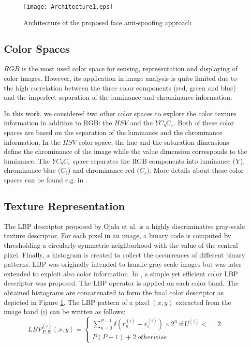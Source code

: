 \documentclass{article}
\begin{document}
\begin{figure*}[t]
	\begin{center}
		\texttt{[image: Architecture1.eps]}		
	\end{center}
		\vspace{-6mm}
	\caption{Architecture of the proposed face anti-spoofing approach}
	\label{architecture}
\end{figure*}

	\vspace{-4mm}
\subsection{Color Spaces}
$RGB$ is the most used color space for sensing, representation and displaying of color images. However,  its application in image analysis is quite limited due to the high correlation between the three color components (red, green and blue) and the imperfect separation of the luminance and chrominance information.

In this work, we considered two other color spaces to explore the color texture information in addition to RGB: the $HSV$ and the $YC_bC_r$. Both of these color spaces are based on the separation of the luminance and the chrominance information. In the $HSV$ color space, the hue and the saturation dimensions define the chrominance of the image while the value dimension corresponds to the luminance. The $YC_bC_r$ space separates the RGB components into luminance (Y), chrominance blue ($C_b$) and chrominance red ($C_r$). More details about these color spaces can be found e.g. in  \cite{color_image}. 
	\vspace{-3mm}
\subsection{Texture Representation}  
The LBP descriptor proposed by Ojala et al. \cite{lbp_ojala} is a highly discriminative gray-scale texture descriptor. For each pixel in an image, a binary code is computed by thresholding a circularly symmetric neighborhood with the value of the central pixel. Finally, a histogram is created to collect the occurrences of different binary patterns. LBP was originally intended to handle gray-scale images but was later extended to exploit also color information. In \cite{color_lbp}, a simple yet efficient color LBP descriptor was proposed. The LBP operator is applied on each color band. The obtained histograms are concatenated to form the final color descriptor as depicted in Figure \ref{architecture}. The LBP pattern of a pixel $(x,y)$ extracted from the image band (i) can be written as follows:   
\begin{equation}
LBP_{P,R}^{(i)}(x,y)=
\begin{cases}
\sum_{n=0}^{P-1} \delta(r_{n}^{(i)}-r_{c}^{(i)})\times 2^n ~\text{if}~ U^{(i)}<=2
\\
P(P-1)+2~ otherwise
\end{cases}
\end{equation}
\end{document}

